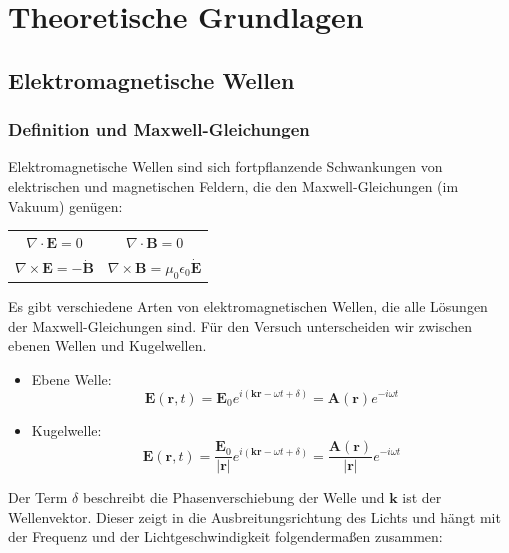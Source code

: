 \section{Theoretische Grundlagen}

\subsection{Elektromagnetische Wellen}

\subsubsection{Definition und Maxwell-Gleichungen}

Elektromagnetische Wellen sind sich fortpflanzende Schwankungen von elektrischen und magnetischen Feldern, die den Maxwell-Gleichungen (im Vakuum) genügen:\\

\begin{center}
\begin{tabular}[H]{c c}
$\nabla\cdot\mathbf E = 0$ & $\nabla\cdot\mathbf B = 0$\\
$\nabla\times\mathbf E = - \mathbf{\dot B}$ & $\nabla \times \mathbf B = \mu_0\epsilon_0\mathbf{\dot E}$
\end{tabular}
\end{center}

Es gibt verschiedene Arten von elektromagnetischen Wellen, die alle Lösungen der Maxwell-Gleichungen sind. Für den Versuch unterscheiden wir zwischen ebenen Wellen und Kugelwellen.

\begin{itemize}
\item Ebene Welle: \begin{equation} \mathbf E(\mathbf r, t) = \mathbf  E_0 e^{i(\mathbf k\mathbf r - \omega t + \delta)} = \mathbf A(\mathbf r)e^{-i\omega t}  \end{equation}
\item Kugelwelle:  \begin{equation} \mathbf E(\mathbf r, t) = \frac{\mathbf  E_0}{|\mathbf r|} e^{i(\mathbf k\mathbf r - \omega t + \delta)} = \frac{\mathbf A(\mathbf r)}{|\mathbf r|}e^{-i\omega t}  \end{equation}
\end{itemize}

Der Term $\delta$ beschreibt die Phasenverschiebung der Welle und $\mathbf k$ ist der Wellenvektor. Dieser zeigt in die Ausbreitungsrichtung des Lichts und hängt mit der Frequenz und der Lichtgeschwindigkeit folgendermaßen zusammen:


